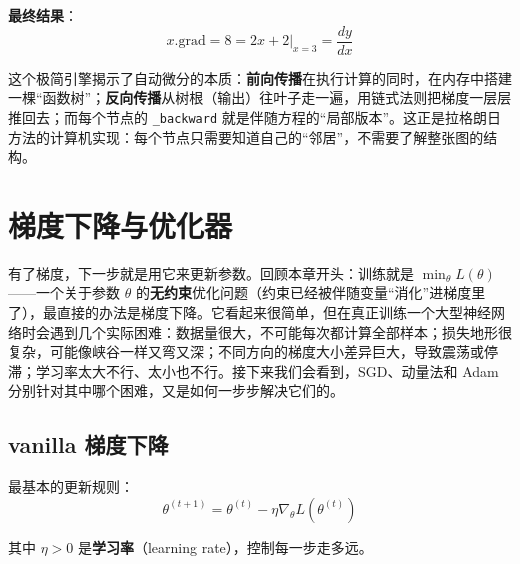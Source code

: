 \vspace{0.3cm}
\noindent\textbf{最终结果}：
\begin{equation*}
x.\text{grad} = 8 = 2x + 2 \big|_{x=3} = \frac{dy}{dx}
\end{equation*}


\begin{physicalmeaning}
这个极简引擎揭示了自动微分的本质：\textbf{前向传播}在执行计算的同时，在内存中搭建一棵``函数树''；\textbf{反向传播}从树根（输出）往叶子走一遍，用链式法则把梯度一层层推回去；而每个节点的 \texttt{\_backward} 就是伴随方程的``局部版本''。这正是拉格朗日方法的计算机实现：每个节点只需要知道自己的``邻居''，不需要了解整张图的结构。
\end{physicalmeaning}


\section{梯度下降与优化器}
有了梯度，下一步就是用它来更新参数。回顾本章开头：训练就是 $\min_\theta L(\theta)$——一个关于参数 $\theta$ 的\textbf{无约束}优化问题（约束已经被伴随变量“消化”进梯度里了），最直接的办法是梯度下降。它看起来很简单，但在真正训练一个大型神经网络时会遇到几个实际困难：数据量很大，不可能每次都计算全部样本；损失地形很复杂，可能像峡谷一样又弯又深；不同方向的梯度大小差异巨大，导致震荡或停滞；学习率太大不行、太小也不行。接下来我们会看到，SGD、动量法和 Adam 分别针对其中哪个困难，又是如何一步步解决它们的。


\subsection{vanilla 梯度下降}

最基本的更新规则：
\begin{equation}
\theta^{(t+1)} = \theta^{(t)} - \eta \nabla_\theta L(\theta^{(t)})
\end{equation}

其中 $\eta > 0$ 是\textbf{学习率}（learning rate），控制每一步走多远。

